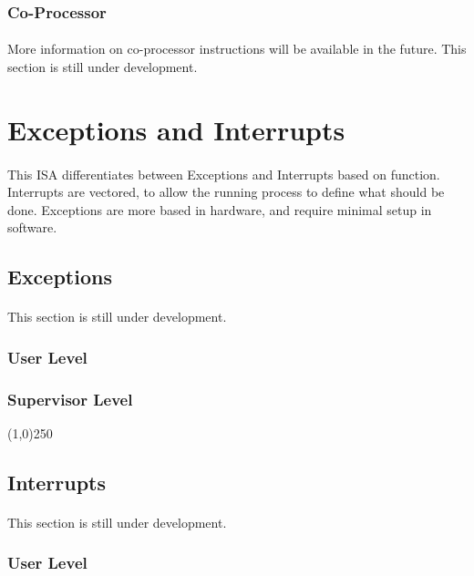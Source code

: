 \documentclass[letterpaper, 11pt]{article}
\begin{document}
\subsubsection{Co-Processor}
\paragraph{} More information on co-processor instructions will be available
in the future. This section is still under development.

\clearpage
\section{Exceptions and Interrupts}
\paragraph{} This ISA differentiates between Exceptions and Interrupts based on function. Interrupts are vectored, to allow
the running process to define what should be done. Exceptions are more based in hardware, and require minimal setup in software.

\subsection{Exceptions}
\paragraph{} This section is still under development. 
\subsubsection{User Level}
\subsubsection{Supervisor Level}

\begin{center}
	\line(1,0){250}
\end{center}

\subsection{Interrupts}
\paragraph{} This section is still under development.
\subsubsection{User Level}
\end{document}
